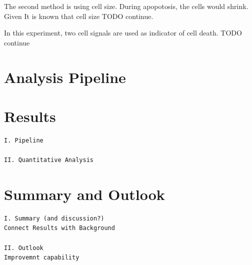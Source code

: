 \documentclass[pdftex,12pt,a4paper]{report}
\begin{document}
The second method is using cell size. During apopotosis, the cells would shrink. Given It is known that cell size TODO continue.

In this experiment, two cell signals are used as indicator of cell death. TODO continue

\chapter{Analysis Pipeline}

\chapter{Results}

\begin{verbatim}
I. Pipeline

II. Quantitative Analysis
\end{verbatim}

\chapter{Summary and Outlook}

\begin{verbatim}
I. Summary (and discussion?)
Connect Results with Background

II. Outlook
Improvemnt capability
\end{verbatim}





\end{document}
